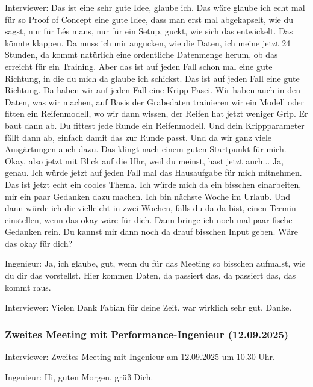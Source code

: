 Interviewer:
Das ist eine sehr gute Idee, glaube ich. Das wäre glaube ich echt mal für so Proof of Concept eine gute Idee, dass man erst mal abgekapselt, wie du sagst, nur für Lés mans, nur für ein Setup, guckt, wie sich das entwickelt. Das könnte klappen. Da muss ich mir angucken, wie die Daten, ich meine jetzt 24 Stunden, da kommt natürlich eine ordentliche Datenmenge herum, ob das erreicht für ein Training. Aber das ist auf jeden Fall schon mal eine gute Richtung, in die du mich da glaube ich schickst. Das ist auf jeden Fall eine gute Richtung. Da haben wir auf jeden Fall eine Kripp-Pasei. Wir haben auch in den Daten, was wir machen, auf Basis der Grabedaten trainieren wir ein Modell oder fitten ein Reifenmodell, wo wir dann wissen, der Reifen hat jetzt weniger Grip. Er baut dann ab. Du fittest jede Runde ein Reifenmodell. Und dein Krippparameter fällt dann ab, einfach damit das zur Runde passt. Und da wir ganz viele Ausgärtungen auch dazu.  Das klingt nach  einem guten  Startpunkt für mich. Okay, also jetzt mit Blick auf die Uhr, weil du meinst, hast jetzt auch... Ja, genau. Ich würde jetzt auf jeden Fall mal das Hausaufgabe für mich mitnehmen. Das ist jetzt echt ein cooles Thema. Ich würde mich da ein bisschen einarbeiten, mir ein paar Gedanken dazu machen. Ich bin nächste Woche im Urlaub. Und dann würde ich dir vielleicht in zwei Wochen, falls du da da bist, einen Termin einstellen, wenn das okay wäre für dich.  Dann bringe ich noch mal paar fische Gedanken rein. Du kannst mir dann noch da drauf bisschen Input geben. Wäre das okay für dich? 

Ingenieur:
Ja, ich glaube, gut, wenn du für das Meeting so bisschen aufmalst, wie du dir das vorstellst. Hier kommen Daten, da passiert das, da passiert das, das kommt raus. 

Interviewer:
Vielen Dank Fabian für deine Zeit. war wirklich sehr gut. Danke.

\subsubsection{Zweites Meeting mit Performance-Ingenieur (12.09.2025)}
\label{subsec:transkript-meeting2}


Interviewer:
Zweites Meeting mit Ingenieur am 12.09.2025 um  10.30 Uhr.

Ingenieur:
Hi, guten Morgen, grüß Dich. 

